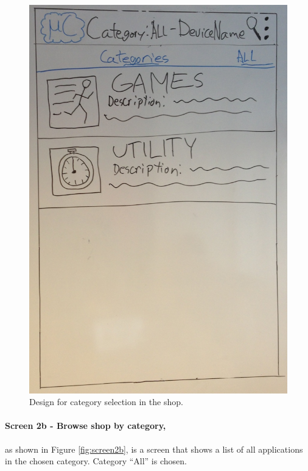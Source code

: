 \begin{figure}[H]
\centering
\includegraphics[scale=0.2]{images/Design_guide/Screen2a.png}
\caption[Screen 2a - Browse shop]{Design for category selection in the shop.}
\label{fig:screen2a}
\end{figure}


\paragraph{Screen 2b - Browse shop by category,} as shown in Figure \ref{fig:screen2b}, is a
 screen that shows a list of all applications in the chosen category. Category ``All'' is chosen.

